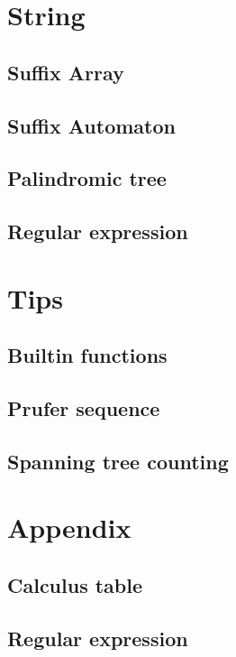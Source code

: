 \documentclass[titlepage, a4paper,10pt]{article}
\begin{document}
\begin{multicols}{2}
\begin{spacing}{0.6}
		\section{String}
			\subsection{Suffix Array}
				
			\subsection{Suffix Automaton}
				
			\subsection{Palindromic tree}
				
			\subsection{Regular expression}
				
		\section{Tips}
			\subsection{Builtin functions}
				
			\subsection{Prufer sequence}
				
			\subsection{Spanning tree counting}
				
		\section{Appendix}
			\subsection{Calculus table}
				
				
			\subsection{Regular expression}
				
		\end{spacing}
		\endgroup
	\end{multicols}
\end{document}
